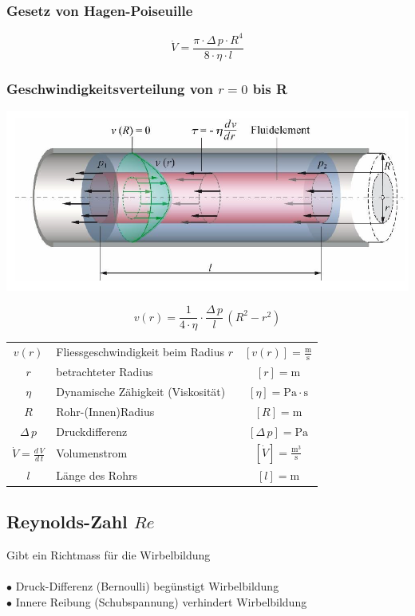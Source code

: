 \subsubsection{Gesetz von Hagen-Poiseuille}

$$ \boxed{ \dot{V} = \frac{\pi \cdot \Delta \, p \cdot R^4}{8 \cdot \eta \cdot l} } $$
 
\subsubsection{Geschwindigkeitsverteilung von $r=0$ bis R}

\includegraphics[width=0.8\linewidth]{Bilder/laminare_geschwindigkeit.png}

$$ \boxed{ v(r) = \frac{1}{4 \cdot \eta} \cdot \frac{\Delta \, p}{l} \, (R^2 - r^2) } $$



\begin{tabular}{c l c}
		\rule{0pt}{8pt}$v(r)$ & Fliessgeschwindigkeit beim Radius $r$ & $[v(r)] = \mathrm{\frac{m}{s}}$ \\
		$r$ & betrachteter Radius & $[r] = \mathrm{m}$ \\
		$\eta$ & Dynamische Zähigkeit (Viskosität) & $[\eta] = \mathrm{Pa \cdot s}$  \\
		$R$ & Rohr-(Innen)Radius & $[R] = \mathrm{m}$ \\
		$\Delta \, p$ & Druckdifferenz & $[\Delta \, p] = \mathrm{Pa}$ \\
		\rule{0pt}{8pt}$\dot{V} = \frac{d \, V}{d \, t}$ &  Volumenstrom & $[\dot{V}] = \mathrm{\frac{m^3}{s}}$	 \\
		$l$ & Länge des Rohrs & $[l] = \mathrm{m}$
\end{tabular}



\subsection{Reynolds-Zahl $Re$}
Gibt ein Richtmass für die Wirbelbildung  \\
\\
$\bullet$ Druck-Differenz (Bernoulli) begünstigt Wirbelbildung \\
$\bullet$ Innere Reibung (Schubspannung) verhindert Wirbelbildung 

